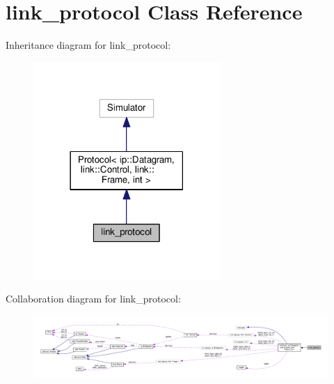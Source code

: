 \hypertarget{classlink__protocol}{}\section{link\+\_\+protocol Class Reference}
\label{classlink__protocol}


Inheritance diagram for link\+\_\+protocol\+:\nopagebreak
\begin{figure}[H]
\begin{center}
\leavevmode
\includegraphics[width=201pt]{classlink__protocol__inherit__graph}
\end{center}
\end{figure}


Collaboration diagram for link\+\_\+protocol\+:\nopagebreak
\begin{figure}[H]
\begin{center}
\leavevmode
\includegraphics[width=350pt]{classlink__protocol__coll__graph}
\end{center}
\end{figure}
